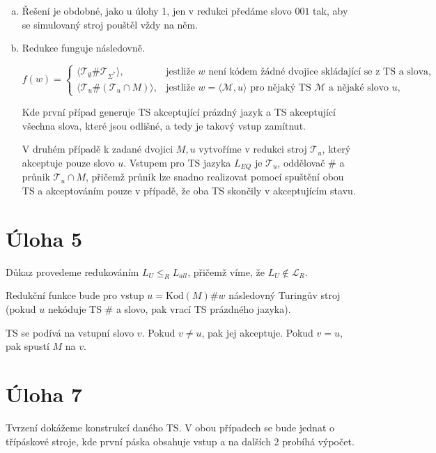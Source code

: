 \documentclass[a4paper]{article}
\begin{document}
\begin{enumerate}[(a)]
    \item Řešení je obdobné, jako u úlohy 1, jen v redukci předáme slovo $001$ tak, aby se simulovaný stroj pouštěl vždy na něm.
    \item Redukce funguje následovně.
    
    \[
        f(w) = 
        \begin{cases}
            \langle \mathcal{T}_{\emptyset} \# \mathcal{T}_{\Sigma^{*}} \rangle, & \text{jestliže } w \text{ není kódem žádné dvojice skládající se z TS a slova, } \\
            \langle \mathcal{T}_{u} \# (\mathcal{T}_{u} \cap M) \rangle, & \text{jestliže } w = \langle \mathcal{M}, u \rangle \text{ pro nějaký TS } \mathcal{M} \text{ a nějaké slovo } u,
        \end{cases}
    \]
    
    Kde první případ generuje TS akceptující prázdný jazyk a TS akceptující všechna slova, které jsou odlišné, a tedy je takový vstup zamítnut.
    
    V druhém případě k zadané dvojici $M, u$ vytvoříme v redukci stroj $\mathcal{T}_{u}$, který akceptuje pouze slovo $u$. Vstupem pro TS jazyka $L_{EQ}$ je $\mathcal{T}_{u}$, oddělovač \# a průnik $\mathcal{T}_{u} \cap M$, přičemž průnik lze snadno realizovat pomocí spuštění obou TS a akceptováním pouze v případě, že oba TS skončily v akceptujícím stavu.
\end{enumerate}

\section*{Úloha 5}

Důkaz provedeme redukováním $L_{U} \leq_{R} L_{all}$, přičemž víme, že $L_{U} \not \in \mathcal{L}_{R}$.

Redukční funkce bude pro vstup $u = \textrm{Kod}(M)\#w$ následovný Turingův stroj (pokud $u$ nekóduje TS \# a slovo, pak vrací TS prázdného jazyka).

TS se podívá na vstupní slovo $v$. Pokud $v \not = u$, pak jej akceptuje. Pokud $v = u$, pak spustí $M$ na $v$.


\section*{Úloha 7}

Tvrzení dokážeme konstrukcí daného TS. V obou případech se bude jednat o třípáskové stroje, kde první páska obsahuje vstup a na dalších 2 probíhá výpočet.
\end{document}
